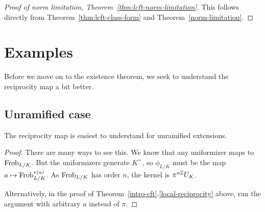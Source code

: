 \begin{proof}[Proof of norm limitation, Theorem~\ref{thm:lcft-norm-limitation}]
This follows directly from
Theorem~\ref{thm:lcft-class-form} %
and Theorem~\ref{norm-limitation}.
\end{proof}
\section{Examples}
Before we move on to the existence theorem, we seek to understand the reciprocity map a bit better. 
\subsection{Unramified case}
The reciprocity map is easiest to understand for unramified extensions.
\begin{proof}
There are many ways to see this. We know that any uniformizer maps to $\operatorname{Frob}_{L/K}$. But the uniformizers generate $K^{\times}$, so $\phi_{L/K}$ must be the map $a\mapsto \operatorname{Frob}_{L/K}^{v(a)}$. As $\operatorname{Frob}_{L/K}$ has order $n$, the kernel is $\pi^{n\mathbb{Z}}U_K$.

Alternatively, in the proof of Theorem~\ref{intro-cft}.\ref{local-reciprocity} above, run the argument with arbitrary $a$ instead of $\pi$. 
\end{proof}
